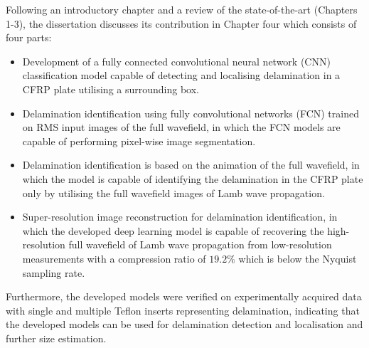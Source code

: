 {	Following an introductory chapter and a review of the state-of-the-art (Chapters 1-3), the dissertation discusses its contribution in Chapter four which consists of four parts:
	\begin{itemize}
		\item Development of a fully connected convolutional neural network (CNN) classification model capable of detecting and localising delamination in a CFRP plate utilising a surrounding box.
		\item Delamination identification using fully convolutional networks (FCN) trained on RMS input images of the full wavefield, in which the FCN models are capable of performing pixel-wise image segmentation.
		\item Delamination identification is based on the animation of the full wavefield, in which the model is capable of identifying the delamination in the CFRP plate only by utilising the full wavefield images of Lamb wave propagation.
		\item Super-resolution image reconstruction for delamination identification, in which the developed deep learning model is capable of recovering the high-resolution full wavefield of Lamb wave propagation from low-resolution measurements with a compression ratio of $19.2\%$ which is below the Nyquist sampling rate.
	\end{itemize}
	Furthermore, the developed models were verified on experimentally acquired data with single and multiple Teflon inserts representing delamination, indicating that the developed models can be used for
	delamination detection and localisation and further size estimation.
}

